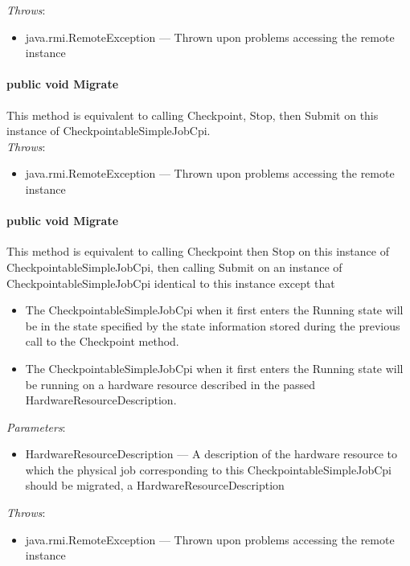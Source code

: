 \documentclass[$Date: 2003/06/26 19:29:31 $]{glabarticle}
\begin{document}
 \textit{Throws}:
 \begin{itemize}
 \item[] java.rmi.RemoteException --- Thrown upon problems accessing the remote instance 
 \end{itemize}

\paragraph{public  void Migrate}

This method is equivalent to calling Checkpoint, Stop, then Submit on
this instance of CheckpointableSimpleJobCpi. \\

 \textit{Throws}:
 \begin{itemize}
 \item[] java.rmi.RemoteException --- Thrown upon problems accessing the remote instance 
 \end{itemize}

\paragraph{public void Migrate}

This method is equivalent to calling Checkpoint then Stop on this
instance of CheckpointableSimpleJobCpi, then calling Submit on an
instance of CheckpointableSimpleJobCpi identical to this instance except
that

\begin{itemize}
 \item The CheckpointableSimpleJobCpi when it first enters the Running state will be in the state specified 
 by the state information  stored during the previous call to the Checkpoint method.
 \item The CheckpointableSimpleJobCpi when it first enters the Running state will be running on a hardware 
 resource described in the passed HardwareResourceDescription.
\end{itemize}

 \textit{Parameters}:
 \begin{itemize}
 \item[] HardwareResourceDescription --- A description of the hardware resource to which the physical job
 corresponding to this CheckpointableSimpleJobCpi should be migrated, a HardwareResourceDescription
 \end{itemize}

 \textit{Throws}:
 \begin{itemize}
 \item[] java.rmi.RemoteException --- Thrown upon problems accessing the remote instance 
 \end{itemize}
\end{document}
